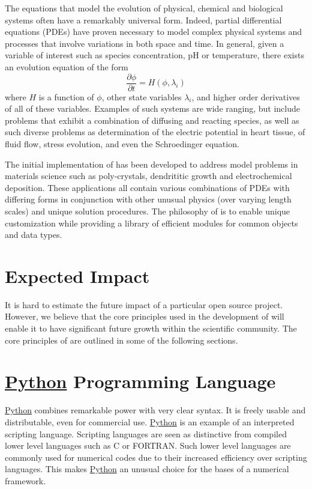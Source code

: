 The equations that model the evolution of physical, chemical and
biological systems often have a remarkably universal form. Indeed,
partial differential equations (PDEs) have proven necessary to model
complex physical systems and processes that involve variations in both
space and time.  In general, given a variable of interest such as
species concentration, pH or temperature, there exists an evolution
equation of the form
\begin{equation}
  \frac{\partial \phi}{\partial t} = H(\phi, \lambda_i)
  \label{eqn:general-equation}
\end{equation}
where $H$ is a function of $\phi$, other state variables $\lambda_i$,
and higher order derivatives of all of these variables. Examples of
such systems are wide ranging, but include problems that exhibit a
combination of diffusing and reacting species, as well as such diverse
problems as determination of the electric potential in heart tissue,
of fluid flow, stress evolution, and even the Schroedinger equation.

The initial implementation of \FiPy{} has been developed to address
model problems in materials science such as poly-crystals, dendrititic
growth and electrochemical deposition. These applications all contain
various combinations of PDEs with differing forms in conjunction with
other unusual physics (over varying length scales) and unique solution
procedures. The philosophy of \FiPy{} is to enable unique
customization while providing a library of efficient modules for
common objects and data types.

\section{Expected Impact}

It is hard to estimate the future impact of a particular open source
project. However, we believe that the core principles used in the development of
\FiPy{} will enable it to have significant future growth 
within the scientific community. The core principles of \FiPy{} are
outlined in some of the following sections.

\section{\href{http://www.python.org/}{Python} Programming Language}

\href{http://www.python.org/}{Python} combines
remarkable power with very clear syntax. It is freely usable and
distributable, even for commercial
use. \href{http://www.python.org/}{Python} is an example of an
interpreted scripting language. Scripting languages are seen as
distinctive from compiled lower level languages such as C or
FORTRAN. Such lower level languages are commonly used for numerical
codes due to their increased efficiency over scripting languages. This
makes \href{http://www.python.org/}{Python} an unusual choice for the
bases of a numerical framework.

